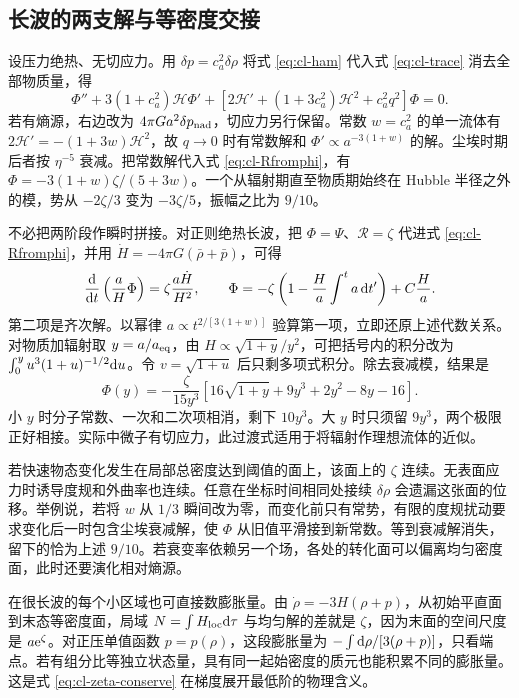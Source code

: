 \subsection{长波的两支解与等密度交接}

设压力绝热、无切应力。用 $\delta p=c_a^2\delta\rho$ 将式 \eqref{eq:cl-ham} 代入式 \eqref{eq:cl-trace} 消去全部物质量，得
\begin{equation}\label{eq:cl-potential}
 \Phi''+3(1+c_a^2)\mathcal H\Phi'
 +[2\mathcal H'+(1+3c_a^2)\mathcal H^2+c_a^2 q^2]\Phi=0 .
\end{equation}
若有熵源，右边改为 $4\pi G a^2\delta p_{\rm nad}$，切应力另行保留。常数 $w=c_a^2$ 的单一流体有 $2\mathcal H'=-(1+3w)\mathcal H^2$，故 $q\to0$ 时有常数解和 $\Phi'\propto a^{-3(1+w)}$ 的解。尘埃时期后者按 $\eta^{-5}$ 衰减。把常数解代入式 \eqref{eq:cl-Rfromphi}，有 $\Phi=-3(1+w)\zeta/(5+3w)$。一个从辐射期直至物质期始终在 Hubble 半径之外的模，势从 $-2\zeta/3$ 变为 $-3\zeta/5$，振幅之比为 $9/10$。

不必把两阶段作瞬时拼接。对正则绝热长波，把 $\Phi=\Psi$、$\mathcal R=\zeta$ 代进式 \eqref{eq:cl-Rfromphi}，并用 $\dot H=-4\pi G(\bar\rho+\bar p)$，可得
\[
 \frac{\dd}{\dd t}\left(\frac{a}{H}\Phi\right)
       =\zeta\frac{a\dot H}{H^2},\qquad
 \Phi=-\zeta\left(1-\frac H a\int^t a\,\dd t'\right)
          +C\frac H a .
\]
第二项是齐次解。以幂律 $a\propto t^{2/[3(1+w)]}$ 验算第一项，立即还原上述代数关系。对物质加辐射取 $y=a/a_{\rm eq}$，由 $H\propto\sqrt{1+y}/y^2$，可把括号内的积分改为 $\int_0^y u^3(1+u)^{-1/2}\dd u$。令 $v=\sqrt{1+u}$ 后只剩多项式积分。除去衰减模，结果是
\[
 \Phi(y)=-\frac{\zeta}{15y^3}
  \left[16\sqrt{1+y}+9y^3+2y^2-8y-16\right].
\]
小 $y$ 时分子常数、一次和二次项相消，剩下 $10y^3$。大 $y$ 时只须留 $9y^3$，两个极限正好相接。实际中微子有切应力，此过渡式适用于将辐射作理想流体的近似。

若快速物态变化发生在局部总密度达到阈值的面上，该面上的 $\zeta$ 连续。无表面应力时诱导度规和外曲率也连续。任意在坐标时间相同处接续 $\delta\rho$ 会遗漏这张面的位移。举例说，若将 $w$ 从 $1/3$ 瞬间改为零，而变化前只有常势，有限的度规扰动要求变化后一时包含尘埃衰减解，使 $\Phi$ 从旧值平滑接到新常数。等到衰减解消失，留下的恰为上述 $9/10$。若衰变率依赖另一个场，各处的转化面可以偏离均匀密度面，此时还要演化相对熵源。

在很长波的每个小区域也可直接数膨胀量。由 $\dot\rho=-3H(\rho+p)$，从初始平直面到末态等密度面，局域 $N=\int H_{\rm loc}\dd\tau$ 与均匀解的差就是 $\zeta$，因为末面的空间尺度是 $a\mathrm{e}^{\zeta}$。对正压单值函数 $p=p(\rho)$，这段膨胀量为 $-\int \dd\rho/[3(\rho+p)]$，只看端点。若有组分比等独立状态量，具有同一起始密度的质元也能积累不同的膨胀量。这是式 \eqref{eq:cl-zeta-conserve} 在梯度展开最低阶的物理含义。

